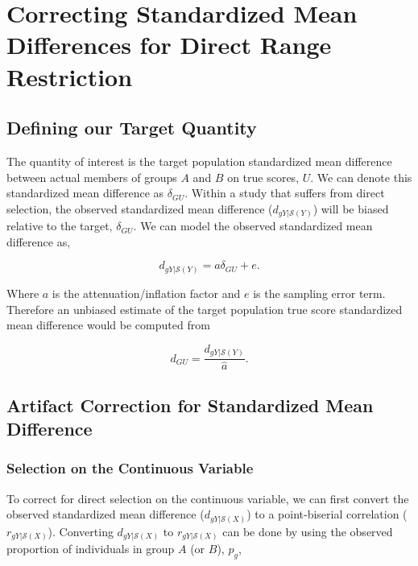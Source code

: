 \documentclass[
  letterpaper,
  DIV=11,
  numbers=noendperiod]{scrreprt}
\begin{document}
\section{Correcting Standardized Mean Differences for Direct Range
Restriction}\label{correcting-standardized-mean-differences-for-direct-range-restriction}

\subsection{Defining our Target
Quantity}\label{defining-our-target-quantity-5}

The quantity of interest is the target population standardized mean
difference between actual members of groups \(A\) and \(B\) on true
scores, \(U\). We can denote this standardized mean difference as
\(\delta_{GU}\). Within a study that suffers from direct selection, the
observed standardized mean difference (\(d_{gY|\mathcal{S}(Y)}\)) will
be biased relative to the target, \(\delta_{GU}\). We can model the
observed standardized mean difference as,

\[
d_{gY|\mathcal{S}(Y)}= a \delta_{GU} + e.
\]

Where \(a\) is the attenuation/inflation factor and \(e\) is the
sampling error term. Therefore an unbiased estimate of the target
population true score standardized mean difference would be computed
from

\[
d_{GU} = \frac{ d_{gY|\mathcal{S}(Y)} }{ \hat{a}}.
\]

\subsection{Artifact Correction for Standardized Mean
Difference}\label{artifact-correction-for-standardized-mean-difference-1}

\subsubsection{Selection on the Continuous
Variable}\label{selection-on-the-continuous-variable}

To correct for direct selection on the continuous variable, we can first
convert the observed standardized mean difference
(\(d_{gY|\mathcal{S}(X)}\)) to a point-biserial correlation
(\(r_{gY|\mathcal{S}(X)}\)). Converting \(d_{gY|\mathcal{S}(X)}\) to
\(r_{gY|\mathcal{S}(X)}\) can be done by using the observed proportion
of individuals in group \(A\) (or \(B\)), \(p_g\),
\end{document}

